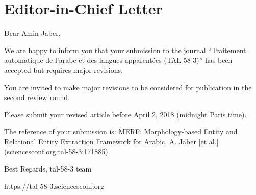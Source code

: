 \section*{Editor-in-Chief Letter}

Dear Amin Jaber,

We are happy to inform you that your submission to the journal 
``Traitement automatique de l'arabe et des langues apparentées (TAL 58-3)''
has been accepted but requires major revisions.

You are invited to make major revisions to be considered for publication in 
the second review round.

Please submit your revised article before April 2, 2018 (midnight Paris time).


The reference of your submission is:
MERF: Morphology-based Entity and Relational Entity Extraction Framework for Arabic, 
A. Jaber [et al.] (sciencesconf.org:tal-58-3:171885)

Best Regards,
tal-58-3 team

https://tal-58-3.sciencesconf.org


